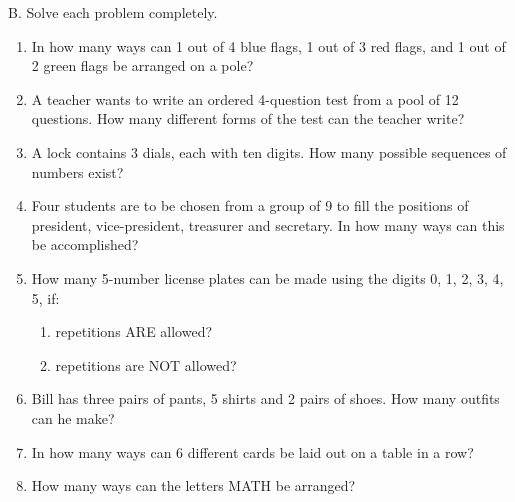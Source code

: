 B. Solve each problem completely. 

\begin{enumerate}[label = \arabic*. ]

\item  In how many ways can 1 out of 4 blue flags, 1 out of 3 red flags, and 1 out of 2 green flags be arranged on a pole?  
\item  A teacher wants to write an ordered 4-question test from a pool of 12 questions. How many different forms of the test can the teacher write?
\item   A lock contains 3 dials, each with ten digits. How many possible sequences of numbers 
exist? 
\item  Four students are to be chosen from a group of 9 to fill the positions of president, vice-president, treasurer and secretary. In how many ways can this be accomplished? 
\item  How many 5-number license plates can be made using the digits 0, 1, 2, 3, 4, 5, if: 
\begin{enumerate}[label = \alph*. ]
\item repetitions ARE allowed? 
\item repetitions are NOT allowed?
\end{enumerate} 
 
\item  Bill has three pairs of pants, 5 shirts and 2 pairs of shoes. How many outfits can he 
make? 
\item In how many ways can 6 different cards be laid out on a table in a row?  
\item  How many ways can the letters MATH be arranged? 

\end{enumerate} 